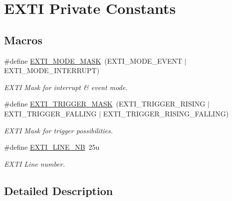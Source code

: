 \hypertarget{group___e_x_t_i___private___constants}{}\section{E\+X\+TI Private Constants}
\label{group___e_x_t_i___private___constants}
\subsection*{Macros}
\begin{DoxyCompactItemize}
\item 
\mbox{\label{group___e_x_t_i___private___constants_ga657f081646b552ee10bdfc7af94b5cdf}} 
\#define \mbox{\hyperlink{group___e_x_t_i___private___constants_ga657f081646b552ee10bdfc7af94b5cdf}{E\+X\+T\+I\+\_\+\+M\+O\+D\+E\+\_\+\+M\+A\+SK}}~(E\+X\+T\+I\+\_\+\+M\+O\+D\+E\+\_\+\+E\+V\+E\+NT $\vert$ E\+X\+T\+I\+\_\+\+M\+O\+D\+E\+\_\+\+I\+N\+T\+E\+R\+R\+U\+PT)
\begin{DoxyCompactList}\small\item\em E\+X\+TI Mask for interrupt \& event mode. \end{DoxyCompactList}\item 
\mbox{\label{group___e_x_t_i___private___constants_ga3e14df666414849fd5a3907a96a2a892}} 
\#define \mbox{\hyperlink{group___e_x_t_i___private___constants_ga3e14df666414849fd5a3907a96a2a892}{E\+X\+T\+I\+\_\+\+T\+R\+I\+G\+G\+E\+R\+\_\+\+M\+A\+SK}}~(E\+X\+T\+I\+\_\+\+T\+R\+I\+G\+G\+E\+R\+\_\+\+R\+I\+S\+I\+NG $\vert$ E\+X\+T\+I\+\_\+\+T\+R\+I\+G\+G\+E\+R\+\_\+\+F\+A\+L\+L\+I\+NG $\vert$ E\+X\+T\+I\+\_\+\+T\+R\+I\+G\+G\+E\+R\+\_\+\+R\+I\+S\+I\+N\+G\+\_\+\+F\+A\+L\+L\+I\+NG)
\begin{DoxyCompactList}\small\item\em E\+X\+TI Mask for trigger possibilities. \end{DoxyCompactList}\item 
\mbox{\label{group___e_x_t_i___private___constants_ga577c4d3186ba6dd303761b23510595ef}} 
\#define \mbox{\hyperlink{group___e_x_t_i___private___constants_ga577c4d3186ba6dd303761b23510595ef}{E\+X\+T\+I\+\_\+\+L\+I\+N\+E\+\_\+\+NB}}~25u
\begin{DoxyCompactList}\small\item\em E\+X\+TI Line number. \end{DoxyCompactList}\end{DoxyCompactItemize}


\subsection{Detailed Description}

